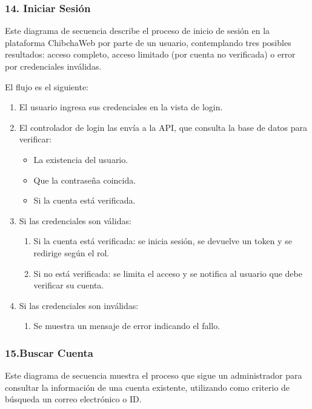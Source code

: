 \subsubsection*{14. Iniciar Sesión}

Este diagrama de secuencia describe el proceso de inicio de sesión en la plataforma ChibchaWeb por parte de un usuario, contemplando tres posibles resultados: acceso completo, acceso limitado (por cuenta no verificada) o error por credenciales inválidas.

El flujo es el siguiente:

\begin{enumerate}
\item El usuario ingresa sus credenciales en la vista de login.
\item El controlador de login las envía a la API, que consulta la base de datos para verificar:
\begin{itemize}
    \item La existencia del usuario.
    \item Que la contraseña coincida.
    \item Si la cuenta está verificada.
\end{itemize}

\item Si las credenciales son válidas:
\begin{enumerate}
    \item Si la cuenta está verificada: se inicia sesión, se devuelve un token y se redirige según el rol.
    \item Si no está verificada: se limita el acceso y se notifica al usuario que debe verificar su cuenta.
\end{enumerate}

\item Si las credenciales son inválidas:
\begin{enumerate}
	\item Se muestra un mensaje de error indicando el fallo.
\end{enumerate}
\end{enumerate}

\subsubsection*{15.Buscar Cuenta}

Este diagrama de secuencia muestra el proceso que sigue un administrador para consultar la información de una cuenta existente, utilizando como criterio de búsqueda un correo electrónico o ID.

